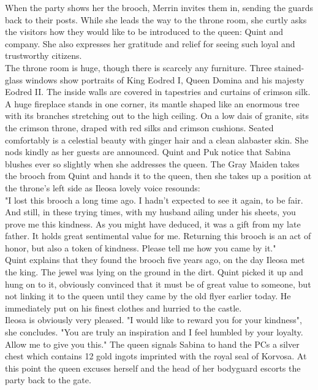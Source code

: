 When the party shows her the brooch, Merrin invites them in, sending the guards back to their posts. While she leads the way to the throne room, she curtly asks the visitors how they would like to be introduced to the queen: Quint and company. She also expresses her gratitude and relief for seeing such loyal and trustworthy citizens.\\

The throne room is huge, though there is scarcely any furniture. Three stained-glass windows show portraits of King Eodred I, Queen Domina and his majesty Eodred II. The inside walls are covered in tapestries and curtains of crimson silk. A huge fireplace stands in one corner, its mantle shaped like an enormous tree with its branches stretching out to the high ceiling. On a low dais of granite, sits the crimson throne, draped with red silks and crimson cushions. Seated comfortably is a celestial beauty with ginger hair and a clean alabaster skin. She nods kindly as her guests are announced. Quint and Puk notice that Sabina blushes ever so slightly when she addresses the queen. The Gray Maiden takes the brooch from Quint and hands it to the queen, then she takes up a position at the throne's left side as Ileosa lovely voice resounds:\\

"I lost this brooch a long time ago. I hadn't expected to see it again, to be fair. And still, in these trying times, with my husband ailing under his sheets, you prove me this kindness. As you might have deduced, it was a gift from my late father. It holds great sentimental value for me. Returning this brooch is an act of honor, but also a token of kindness. Please tell me how you came by it."\\

Quint explains that they found the brooch five years ago, on the day Ileosa met the king. The jewel was lying on the ground in the dirt. Quint picked it up and hung on to it, obviously convinced that it must be of great value to someone, but not linking it to the queen until they came by the old flyer earlier today. He immediately put on his finest clothes and hurried to the castle.\\

Ileosa is obviously very pleased. "I would like to reward you for your kindness", she concludes. "You are truly an inspiration and I feel humbled by your loyalty. Allow me to give you this." The queen signals Sabina to hand the PCs a silver chest which contains 12 gold ingots imprinted with the royal seal of Korvosa. At this point the queen excuses herself and the head of her bodyguard escorts the party back to the gate.\\

